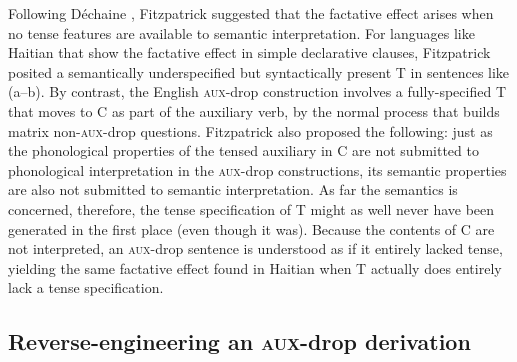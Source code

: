 \documentclass[output=paper]{langscibook}
\begin{document}
\noindent Following Déchaine \citeyearpar{Dechaine1991}, Fitzpatrick suggested that the factative effect arises when no tense features are available to semantic interpretation. For languages like Haitian that show the factative effect in simple declarative clauses, Fitzpatrick posited a semantically underspecified but syntactically present T in sentences like (a--b). By contrast, the English \textsc{aux-}drop construction involves a fully-specified T that moves to C as part of the auxiliary verb, by the normal process that builds matrix non-\textsc{aux}-drop questions. Fitzpatrick also proposed the following: just as the phonological properties of the tensed auxiliary in C are not submitted to phonological interpretation in the \textsc{aux-}drop constructions, its semantic properties are also not submitted to semantic interpretation. As far the semantics is concerned, therefore, the tense specification of T might as well never have been generated in the first place (even though it was). Because the contents of C are not interpreted, an \textsc{aux}-drop sentence is understood as if it entirely lacked tense, yielding the same factative effect found in Haitian when T actually does entirely lack a tense specification.


\subsection{Reverse-engineering an \textsc{aux-}drop derivation}\label{subsec:Reverse-engineering-an-aux-drop}
\end{document}

